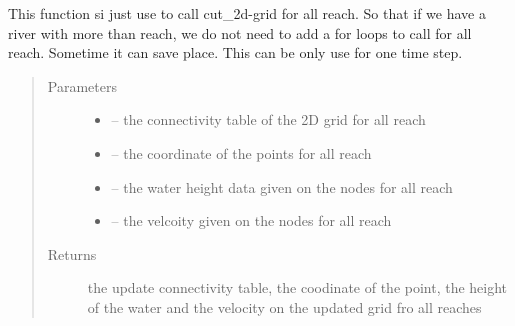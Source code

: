 \documentclass[letterpaper,10pt,english]{sphinxmanual}
\begin{document}

\begin{fulllineitems}
\label{\detokenize{index:src.manage_grid_8.cut_2d_grid_all_reach}}
This function si just use to call cut\_2d-grid for all reach. So that if we have a river with more than reach, we
do not need to add a for loops to call for all reach. Sometime it can save place. This can be only use for one
time step.
\begin{quote}\begin{description}
\item[{Parameters}] \leavevmode\begin{itemize}
\item {} 
 -- the connectivity table of the 2D grid for all reach

\item {} 
 -- the coordinate of the points for all reach

\item {} 
 -- the water height data given on the nodes for all reach

\item {} 
 -- the velcoity given on the nodes for all reach

\end{itemize}

\item[{Returns}] \leavevmode
the update connectivity table, the coodinate of the point, the height of the water and the
velocity on the updated grid fro all reaches

\end{description}\end{quote}

\end{fulllineitems}

\end{document}
